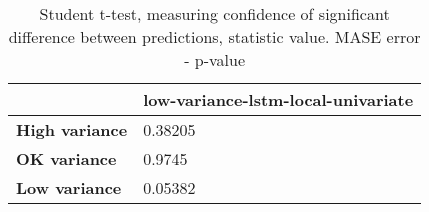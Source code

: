 \begin{table}[H]
\centering
\caption{Student t-test, measuring confidence of significant difference between predictions, statistic value. MASE error - p-value}
\label{table:ttest-p-values-variance-experiments-MASE}
\begin{tabular}{ll}
\toprule
{} & low-variance-lstm-local-univariate \\
\midrule
\textbf{High variance} &                            0.38205 \\
\textbf{OK variance  } &                             0.9745 \\
\textbf{Low variance } &                            0.05382 \\
\bottomrule
\end{tabular}
\end{table}
